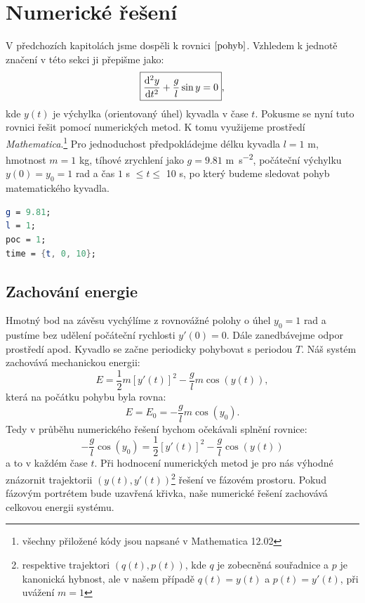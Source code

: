\section{Numerické řešení}
\label{sec:Numerické řešení}

V předchozích kapitolách jsme dospěli k rovnici $\eqref{pohyb}$. Vzhledem k jednotě značení v této sekci ji přepišme jako:
\begin{equation}
\label{rovnice}
\boxed{\frac{\mathrm{d}^{2} y}{\mathrm{d} t ^{2}} + \frac{g}{l}\sin y=0},
\end{equation}
kde $y(t)$ je výchylka (orientovaný úhel) kyvadla v čase $t$.
Pokusme se nyní tuto rovnici řešit pomocí numerických metod. K tomu využijeme prostředí \textit{Mathematica}.\footnote{všechny přiložené kódy jsou napsané v Mathematica 12.02}
Pro jednoduchost předpokládejme délku kyvadla $l=1$ \si{m}, hmotnost $m = 1$ \si{kg}, tíhové zrychlení jako $g = 9.81$ \si{m.s^{-2}}, počáteční výchylku $y(0)=y_{0}=1$ \si{rad} a čas $1$ \si{s} $\leq t \leq$ 10 \si{s}, po který budeme sledovat pohyb matematického kyvadla.
\begin{lstlisting}[language=Mathematica, caption=Konstanty]
g = 9.81;
l = 1;
poc = 1;
time = {t, 0, 10};
\end{lstlisting}

\subsection{Zachování energie}
\label{sec:Zachování energie}
Hmotný bod na závěsu vychýlíme z rovnovážné polohy o úhel $y_{0}=1$ \si{rad} a pustíme bez udělení počáteční rychlosti $y'(0)=0$. Dále zanedbávejme odpor prostředí apod. Kyvadlo se začne periodicky pohybovat s periodou $T$. Náš systém zachovává mechanickou energii:
\begin{equation}
E = \frac{1}{2} m [y'(t)]^{2}- \frac{g}{l} m \cos(y(t)),
\end{equation} 
která na počátku pohybu byla rovna:
\begin{equation}
E = E_{0} = - \frac{g}{l} m \cos(y_{0}).
\end{equation} 
Tedy v průběhu numerického řešení bychom očekávali splnění rovnice:
\begin{equation}
\label{ener}
\boxed{- \frac{g}{l}  \cos(y_{0}) = \frac{1}{2} [y'(t)]^{2} - \frac{g}{l} \cos(y(t))}
\end{equation} 
a to v každém čase $t$. Při hodnocení numerických metod je pro nás výhodné znázornit trajektorii $(y(t),y'(t))$\footnote{respektive trajektori $(q(t),p(t))$, kde $q$ je zobecněná souřadnice a $p$ je kanonická hybnost, ale v našem případě $q(t)=y(t)$ a $p(t)=y'(t)$, při uvážení $m=1$} řešení ve fázovém prostoru. Pokud fázovým portrétem bude uzavřená křivka, naše numerické řešení zachovává celkovou energii systému.

